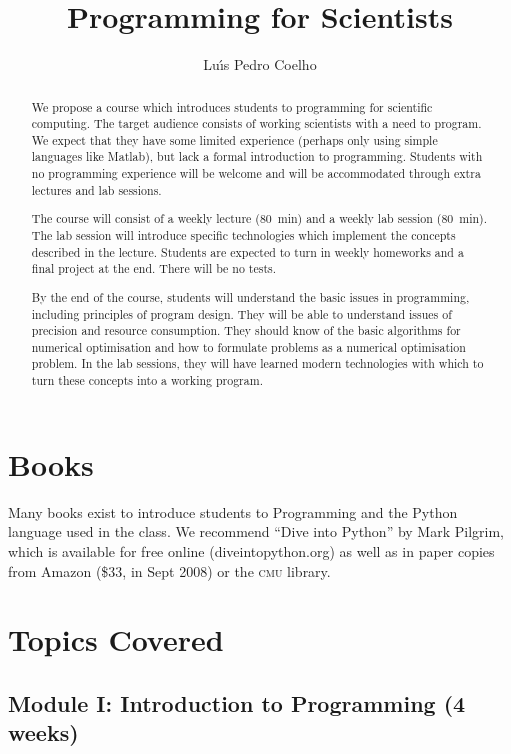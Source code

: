 \documentclass{article}
\title{Programming for Scientists}
\author{Lu\'\i s Pedro Coelho}
\begin{document}
\maketitle

\begin{abstract}
We propose a course which introduces students to programming for scientific computing. The target audience consists of working scientists with a need to program. We expect that they have some limited experience (perhaps only using simple languages like Matlab), but lack a formal introduction to programming. Students with no programming experience will be welcome and will be accommodated through extra lectures and lab sessions.

The course will consist of a weekly lecture (80~min) and a weekly lab session (80~min). The lab session will introduce specific technologies which implement the concepts described in the lecture. Students are expected to turn in weekly homeworks and a final project at the end. There will be no tests.

By the end of the course, students will understand the basic issues in programming, including principles of program design. They will be able to understand issues of precision and resource consumption. They should know of the basic algorithms for numerical optimisation and how to formulate problems as a numerical optimisation problem. In the lab sessions, they will have learned modern technologies with which to turn these concepts into a working program.
\end{abstract}

\section{Books}

Many books exist to introduce students to Programming and the Python language used in the class. We recommend ``Dive into Python'' by Mark Pilgrim, which is available for free online (diveintopython.org) as well as in paper copies from Amazon (\$33, in Sept 2008) or the \textsc{cmu} library.

\section{Topics Covered}

\subsection{Module I: Introduction to Programming (4 weeks)}
\end{document}
